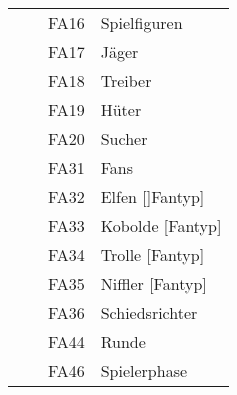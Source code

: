 \begin{tabular}{| l l l l |}
	& & FA16 & Spielfiguren\\
	& & FA17 & Jäger\\
	& & FA18 & Treiber\\
	& & FA19 & Hüter\\
	& & FA20 & Sucher\\
	& & FA31 & Fans\\
	& & FA32 & Elfen []Fantyp]\\
	& & FA33 & Kobolde [Fantyp]\\
	& & FA34 & Trolle [Fantyp]\\
	& & FA35 & Niffler [Fantyp]\\
	& & FA36 & Schiedsrichter\\
	& & FA44 & Runde\\
	& & FA46 & Spielerphase\\\hline
	
\end{tabular}